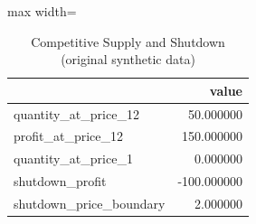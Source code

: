 \begin{table}[htbp]
\centering
\caption{Competitive Supply and Shutdown (original synthetic data)}
\begingroup
\small
\setlength{\tabcolsep}{6pt}
\renewcommand{\arraystretch}{1.12}
\begin{adjustbox}{max width=\linewidth}
\begin{tabular}{@{}lr@{}}
\toprule
 & value \\
\midrule
quantity\_at\_price\_12 & 50.000000 \\
profit\_at\_price\_12 & 150.000000 \\
quantity\_at\_price\_1 & 0.000000 \\
shutdown\_profit & -100.000000 \\
shutdown\_price\_boundary & 2.000000 \\
\bottomrule
\end{tabular}
\end{adjustbox}
\endgroup
\end{table}